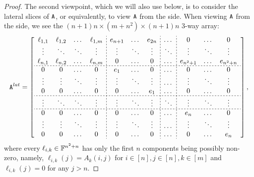 \documentclass[11pt]{article}
\begin{document}
\begin{proof}
The second viewpoint, which we will also use below, is to consider the lateral 
slices of $\mathtt{A}$, or equivalently, to view $\mathtt{A}$ from the side. When viewing $\mathtt{A}$ 
from the side, we see the $(n+1)n \times (m + n^2) \times (n+1)n$  3-way array: 
\begin{equation} \label{eq:alat}
\tA^{lat}=
\left[\begin{array}{cccc;{2pt/2pt}ccc;{2pt/2pt}c;{2pt/2pt}ccc}
\ell_{1,1} & \ell_{1,2} & \dots & \ell_{1,m} & e_{n+1} & \dots & e_{2n} & 
\dots & 0 & \dots & 0\\
\vdots & \ddots & \ddots & \vdots & \vdots & \ddots & \vdots & \ddots & \vdots & 
\ddots & \vdots \\
\ell_{n, 1} & \ell_{n,2} & \dots & \ell_{n,m} & 0 & \dots & 0 & \dots & 
e_{n^2+1} & 
\dots & e_{n^2+n}\\ \hdashline[2pt/2pt]
0 & 0 & \dots  & 0 & e_{1} & \dots & 0 & \dots & 0 & \dots & 0 \\
\vdots & \vdots & \ddots & \vdots & \vdots & \ddots & \vdots& \dots  & \vdots & 
\ddots & 
\vdots \\
0 & 0 & \dots & 0 & 0 & \dots & e_{1} & \dots & 0 & \dots & 0\\ \hdashline[2pt/2pt]
\vdots & \ddots & \ddots & \vdots & \vdots & \ddots & \vdots & \ddots & \vdots & 
\ddots & \vdots \\ \hdashline[2pt/2pt]
0 & 0 & \dots  & 0 & 0 & \dots & 0 & \dots & e_{n} & \dots & 0 \\
\vdots & \vdots & \ddots & \vdots & \vdots & \ddots & \vdots& \dots  & \vdots & 
\ddots & 
\vdots \\ 
0 & 0 & \dots & 0 & 0 & \dots & 0 & \dots & 0 & \dots & e_{n}\\
\end{array}\right],
\end{equation}
where every $\ell_{i,k}\in \mathbb{F}^{n^2+n}$ has only the first $n$ components 
being possibly non-zero, namely, $\ell_{i,k}(j) = A_k(i,j)$ for $i \in [n], j \in [n], k \in [m]$ and $\ell_{i,k}(j) = 0$ for any $j > n$.


\end{proof}
\end{document}
